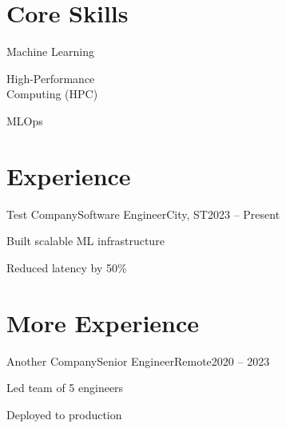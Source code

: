 \begin{paracol}{2}

\section*{Core Skills}
   { \setlength{\baselineskip}{10pt} \setlength{\parskip}{7.5pt} \scshape

    Machine Learning

    High-Performance\\Computing (HPC)

    MLOps

   }

\switchcolumn

\section*{Experience}

    \begin{itemizeAcademic}{Test Company}{Software Engineer}{City, ST}{2023 -- Present}

        \itemi Built scalable ML infrastructure

        \itemi Reduced latency by 50\%

    \end{itemizeAcademic}

\clearpage

\section*{More Experience}

    \begin{itemizeAcademic}{Another Company}{Senior Engineer}{Remote}{2020 -- 2023}

        \itemi Led team of 5 engineers

        \itemi Deployed to production

    \end{itemizeAcademic}

\end{paracol}
